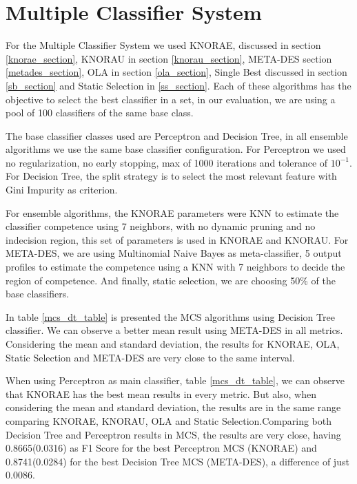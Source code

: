 \section{Multiple Classifier System}\label{mcs}

For the Multiple Classifier System we used KNORAE, discussed in section \ref{knorae_section}, KNORAU in section \ref{knorau_section}, META-DES section \ref{metades_section}, OLA in section \ref{ola_section}, Single Best discussed in section \ref{sb_section} and Static Selection in \ref{ss_section}. Each of these algorithms has the objective to select the best classifier in a set, in our evaluation, we are using a pool of 100 classifiers of the same base class.

The base classifier classes used are Perceptron and Decision Tree, in all ensemble algorithms we use the same base classifier configuration. For Perceptron we used no regularization, no early stopping, max of 1000 iterations and tolerance of $10^{-1}$. For Decision Tree, the split strategy is to select the most relevant feature with Gini Impurity as criterion.

For ensemble algorithms, the KNORAE parameters were KNN to estimate the classifier competence using 7 neighbors, with no dynamic pruning and no indecision region, this set of parameters is used in KNORAE and KNORAU. For META-DES, we are using Multinomial Naive Bayes as meta-classifier, 5 output profiles to estimate the competence using a KNN with 7 neighbors to decide the region of competence. And finally, static selection, we are choosing 50\% of the base classifiers.

In table \ref{mcs_dt_table} is presented the MCS algorithms using Decision Tree classifier. We can observe a better mean result using META-DES in all metrics. Considering the mean and standard deviation, the results for KNORAE, OLA, Static Selection and META-DES are very close to the same interval.

When using Perceptron as main classifier, table \ref{mcs_dt_table}, we can observe that KNORAE has the best mean results in every metric. But also, when considering the mean and standard deviation, the results are in the same range comparing KNORAE, KNORAU, OLA and Static Selection.Comparing both Decision Tree and Perceptron results in MCS, the results are very close, having 0.8665(0.0316) as F1 Score for the best Perceptron MCS (KNORAE) and 0.8741(0.0284) for the best Decision Tree MCS (META-DES), a difference of just 0.0086.

